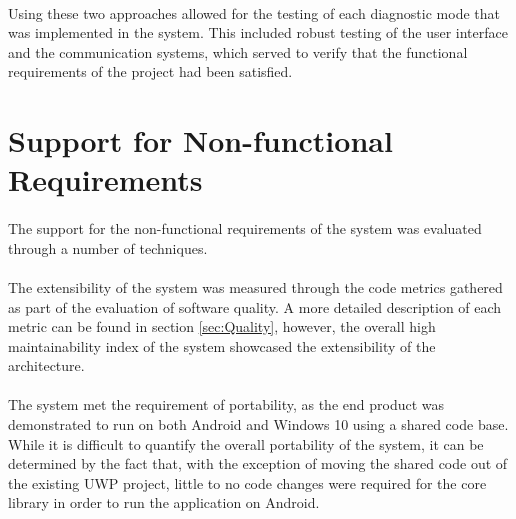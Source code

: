 	\paragraph{}{
	Using these two approaches allowed for the testing of each diagnostic mode that was implemented in the system. This included robust testing of the user interface and the communication systems, which served to verify that the functional requirements of the project had been satisfied. 
	}
	
	
		
\section{Support for Non-functional Requirements}	
	\paragraph{}{
	The support for the non-functional requirements of the system was evaluated through a number of techniques.
	}
	\paragraph{}{
	The extensibility of the system was measured through the code metrics gathered as part of the evaluation of software quality. A more detailed description of each metric can be found in section \ref{sec:Quality}, however, the overall high maintainability index of the system showcased the extensibility of the architecture.
	}
	\paragraph{}{
	The system met the requirement of portability, as the end product was demonstrated to run on both Android and Windows 10 using a shared code base. While it is difficult to quantify the overall portability of the system, it can be determined by the fact that, with the exception of moving the shared code out of the existing UWP project, little to no code changes were required for the core library in order to run the application on Android.
	}
